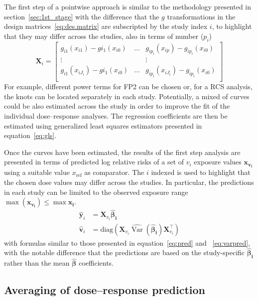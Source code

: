 \documentclass[11pt,a4paper,twoside,openany]{book}\usepackage{knitr}
\DeclareMathOperator{\Var}{Var}
\begin{document}
{The first step of a pointwise approach is similar to the methodology presented in section~\ref{sec:1st_stage} with the difference that the $g$ transformations in the design matrices~\ref{eq:des.matrix} are subscripted by the study index $i$, to highlight that they may differ across the studies, also in terms of number ($p_i$) 
\begin{equation}
 \mathbf{X}_i=\left[
\begin{array}{ccc}
g_{i1}(x_{i1}) - gi_{1}(x_{i0}) & \hdots & g_{ip_i}(x_{ip}) - g_{ip_i}(x_{i0}) \\
\vdots &  & \vdots \\
g_{i1}(x_{iJ_i}) -  gi_{1}(x_{i0}) & \hdots & g_{ip_i}(x_{iJ_i}) -  g_{ip_i}(x_{i0}) \\
\end{array}
\right] 
\label{eq:des.matrix_pwa}
\end{equation}
\noindent For example, different power terms for FP2 can be chosen or, for a RCS analysis, the knots can be located separately in each study. Potentially, a mixed of curves could be also estimated across the study in order to improve the fit of the individual dose--response analyses. The regression coefficients are then be estimated using generalized least squares estimators presented in equation~\ref{eq:gls}.

Once the curves have been estimated, the results of the first step analysis are presented in terms of predicted log relative risks of a set of $v_i$ exposure values $\mathbf{x_{v_i}}$ using a suitable value $x_\mathrm{ref}$ as comparator. The $i$ indexed is used to highlight that the chosen dose values may differ across the studies. In particular, the predictions in each study can be limited to the observed exposure range $\max \left( \mathbf{x_{v_i}} \right) \le \max{\mathbf{x_i}}$.
\begin{align}
\hat {\boldsymbol y}_i &= \mathbf{X}_{v_i} \boldsymbol{\hat \beta_i}
\label{eq:pred_pwa} \\
\hat{\boldsymbol{v}}_i &= \mathrm{diag}\left( \mathbf{X}_{v_i} \widehat{\Var} \left( \boldsymbol{\hat \beta_i} \right) \mathbf{X}_{v_i}^\top \right)
\label{eq:predv_pwa}
\end{align}
\noindent with formulas similar to those presented in equation~\ref{eq:pred} and ~\ref{eq:varpred}, with the notable difference that the predictions are based on the study-specific $\boldsymbol{\hat \beta_i}$ rather than the mean $\boldsymbol{\hat \beta}$ coefficients.

\subsection{Averaging of dose--response prediction}

}
\end{document}
